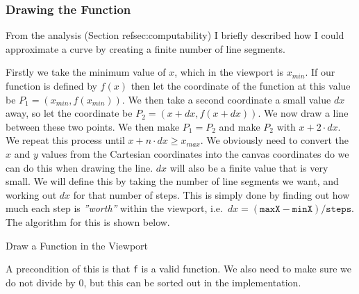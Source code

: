 \documentclass[../../../../../../main.tex]{subfiles}
\begin{document}
\subsubsection{Drawing the Function}
From the analysis (Section ref{sec:computability}) I briefly described how I could approximate a curve by creating a finite number of line segments.

Firstly we take the minimum value of $x$, which in the viewport is $x_{min}$. If our function is defined by $f(x)$ then let the coordinate of the function at this value be $P_1 = (x_{min},f(x_{min}))$. We then take a second coordinate a small value $dx$ away, so let the coordinate be $P_2 = (x+dx,f(x+dx))$. We now draw a line between these two points. We then make $P_1 = P_2$ and make $P_2$ with $x+2\cdot dx$. We repeat this process until $x+n\cdot dx \geq x_{max}$. We obviously need to convert the $x$ and $y$ values from the Cartesian coordinates into the canvas coordinates do we can do this when drawing the line. $dx$ will also be a finite value that is very small. We will define this by taking the number of line segments we want, and working out $dx$ for that number of steps. This is simply done by finding out how much each step is \textit{''worth''} within the viewport, i.e.\ $dx = (\texttt{maxX} - \texttt{minX})/\texttt{steps}$. The algorithm for this is shown below.

\begin{algorithm}
\DontPrintSemicolon
\caption{Draw a Function in the Viewport}
\end{algorithm}

A precondition of this is that \texttt{f} is a valid function. We also need to make sure we do not divide by 0, but this can be sorted out in the implementation.
\end{document}
